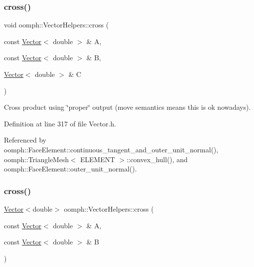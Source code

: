\subsubsection{\texorpdfstring{cross()}{cross()}\hspace{0.1cm}{\footnotesize\ttfamily [1/2]}}
{\footnotesize\ttfamily void oomph\+::\+Vector\+Helpers\+::cross (\begin{DoxyParamCaption}\item[{const \hyperlink{classoomph_1_1Vector}{Vector}$<$ double $>$ \&}]{A,  }\item[{const \hyperlink{classoomph_1_1Vector}{Vector}$<$ double $>$ \&}]{B,  }\item[{\hyperlink{classoomph_1_1Vector}{Vector}$<$ double $>$ \&}]{C }\end{DoxyParamCaption})\hspace{0.3cm}{\ttfamily [inline]}}



Cross product using \char`\"{}proper\char`\"{} output (move semantics means this is ok nowadays). 



Definition at line 317 of file Vector.\+h.



Referenced by oomph\+::\+Face\+Element\+::continuous\+\_\+tangent\+\_\+and\+\_\+outer\+\_\+unit\+\_\+normal(), oomph\+::\+Triangle\+Mesh$<$ E\+L\+E\+M\+E\+N\+T $>$\+::convex\+\_\+hull(), and oomph\+::\+Face\+Element\+::outer\+\_\+unit\+\_\+normal().

\mbox{\label{namespaceoomph_1_1VectorHelpers_aa016aa8f2db73ad16bf65c218e5e0da2}} 
\subsubsection{\texorpdfstring{cross()}{cross()}\hspace{0.1cm}{\footnotesize\ttfamily [2/2]}}
{\footnotesize\ttfamily \hyperlink{classoomph_1_1Vector}{Vector}$<$double$>$ oomph\+::\+Vector\+Helpers\+::cross (\begin{DoxyParamCaption}\item[{const \hyperlink{classoomph_1_1Vector}{Vector}$<$ double $>$ \&}]{A,  }\item[{const \hyperlink{classoomph_1_1Vector}{Vector}$<$ double $>$ \&}]{B }\end{DoxyParamCaption})\hspace{0.3cm}{\ttfamily [inline]}}




